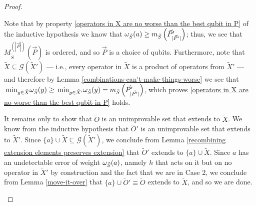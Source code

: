 \documentclass[twocolumn,showpacs,preprintnumbers,amsmath,amssymb,nofootinbib,pra,floatfix]{revtex4-1}
\newcommand{\lst}{\vec}
\newcommand{\set}{\tilde}
\newcommand{\genfun}{\mathcal{G}}
\begin{document}
\begin{proof}
\begin{description}
Note that by property \ref{operators in X are no worse than the best qubit in P} of the inductive hypothesis we know that $\om_{\set S}(a)\ge m_{\set S}\paren{\lst P'_{|\lst P'|}}$;  thus, we see that $M^{(|\lst P|)}_{\set S}(\lst P)$ is ordered, and so $\lst P$ is a choice of qubits.  Furthermore, note that $\set X\subseteq \genfun(\set X')$ --- i.e., every operator in $\set X$ is a product of operators from $\set X'$ --- and therefore by Lemma \ref{combinations-can't-make-things-worse} we see that $\min_{y\in\set X}\om_{\set S}(y)\ge \min_{y\in\set X'}\om_{\set S}(y)=m_{\set S}\paren{\lst P'_{|\lst P'|}}$, which proves \ref{operators in X are no worse than the best qubit in P} holds.

It remains only to show that $\set O$ is an unimprovable set that extends to $\set X$.  We know from the inductive hypothesis that $\set O'$ is an unimprovable set that extends to $\set X'$.  Since $\{a\}\cup\set X\subseteq \genfun(\set X')$, we conclude from Lemma \ref{recombining extension elements preserves extension} that $\set O'$ extends to $\{a\}\cup\set X$.  Since $a$ has an undetectable error of weight $\om_{\set S}(a)$, namely $h$ that acts on it but on no operator in $\set X'$ by construction and the fact that we are in Case 2, we conclude from Lemma \ref{move-it-over} that $\{a\}\cup \set O'\equiv \set O$ extends to $\set X$, and so we are done.
\end{description}

\end{proof}
\end{document}
